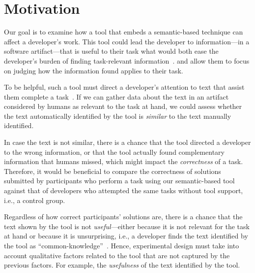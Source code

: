 


\section{Motivation}
\label{cp6:method}



Our goal is to examine how a tool that embeds a semantic-based technique can affect a developer's work.
This tool could lead the developer to information---in a software artifact---that is useful to their task
what would both ease the developer's burden of finding task-relevant information~\cite{Robillard2015}.
and allow them to focus on judging how the information found applies to their task.





To be helpful, such a tool must direct a developer's attention to text that assist them complete a task~\cite{Robillard2015}. If we can gather data about the text in an artifact considered by humans as relevant to the task at hand, we could assess whether the text automatically identified by the tool is \textit{similar} to the text manually identified. 


In case the text is not similar,
there is a chance that the tool directed a developer to the wrong information, or that 
the tool actually found complementary information that humans missed, which might impact the \textit{correctness} of a task. Therefore, it would be beneficial to compare the correctness of solutions submitted by participants who perform a task using our semantic-based tool against that of developers who attempted the same tasks without tool support, i.e., a control group.


Regardless of how correct participants' solutions are, there is a chance that the text shown by the tool is not \textit{useful}---either because it is not relevant for the task at hand or because it is unsurprising, i.e., 
a developer finds the text identified by the tool as ``common-knowledge''~\cite{cwalina2008, Robillard2015}. Hence, experimental design must take into account qualitative factors 
related to the tool that are not captured by the previous factors. For example, the \textit{usefulness} of the text identified by the tool. 




